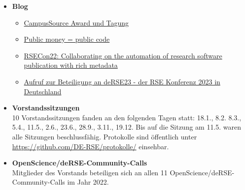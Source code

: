 \begin{itemize}
 \item \textbf{Blog}
 \begin{itemize}
  \item \href{https://de-rse.org/blog/2022/04/13/campusSource-Award.html}{CampusSource Award und Tagung}
  \item \href{https://de-rse.org/blog/2022/05/16/public-money-public-code.html}{Public money = public code}
  \item \href{https://de-rse.org/blog/2022/09/29/rsecon22-collaborating-on-the-automation-of-research-software-publication-with-rich-metadata.html}{RSECon22: Collaborating on the automation of research software publication with rich metadata}
  \item \href{https://de-rse.org/blog/2022/10/12/deRSE23-call-for-contribution-de.html}{Aufruf zur Beteiligung an deRSE23 - der RSE Konferenz 2023 in Deutschland}
 \end{itemize}
 \item \textbf{Vorstandssitzungen}\\
  10 Vorstandssitzungen fanden an den folgenden Tagen statt: 18.1., 8.2. 8.3., 5.4., 11.5., 2.6., 23.6., 28.9., 3.11., 19.12.
  Bis auf die Sitzung am 11.5. waren alle Sitzungen beschlussfähig.
  Protokolle sind öffentlich unter \href{https://github.com/DE-RSE/protokolle/}{https://github.com/DE-RSE/protokolle/} einsehbar.
 \item \textbf{OpenScience/deRSE-Community-Calls}\\
 Mitglieder des Vorstands beteiligen sich an allen 11 OpenScience/deRSE-Community-Calls im Jahr 2022.
\end{itemize}




